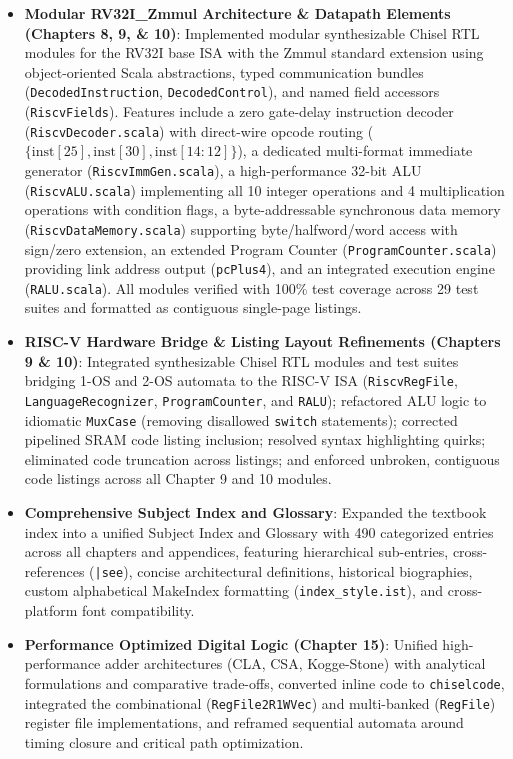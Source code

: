 \begin{itemize}
    \item \textbf{Modular RV32I\_Zmmul Architecture \& Datapath Elements (Chapters 8, 9, \& 10)}: Implemented modular synthesizable Chisel RTL modules for the RV32I base ISA with the Zmmul standard extension using object-oriented Scala abstractions, typed communication bundles (\texttt{DecodedInstruction}, \texttt{DecodedControl}), and named field accessors (\texttt{RiscvFields}). Features include a zero gate-delay instruction decoder (\texttt{RiscvDecoder.scala}) with direct-wire opcode routing ($\{\text{inst}[25], \text{inst}[30], \text{inst}[14:12]\}$), a dedicated multi-format immediate generator (\texttt{RiscvImmGen.scala}), a high-performance 32-bit ALU (\texttt{RiscvALU.scala}) implementing all 10 integer operations and 4 multiplication operations with condition flags, a byte-addressable synchronous data memory (\texttt{RiscvDataMemory.scala}) supporting byte/halfword/word access with sign/zero extension, an extended Program Counter (\texttt{ProgramCounter.scala}) providing link address output (\texttt{pcPlus4}), and an integrated execution engine (\texttt{RALU.scala}). All modules verified with 100\% test coverage across 29 test suites and formatted as contiguous single-page listings.
    \item \textbf{RISC-V Hardware Bridge \& Listing Layout Refinements (Chapters 9 \& 10)}: Integrated synthesizable Chisel RTL modules and test suites bridging 1-OS and 2-OS automata to the RISC-V ISA (\texttt{RiscvRegFile}, \texttt{LanguageRecognizer}, \texttt{ProgramCounter}, and \texttt{RALU}); refactored ALU logic to idiomatic \texttt{MuxCase} (removing disallowed \texttt{switch} statements); corrected pipelined SRAM code listing inclusion; resolved syntax highlighting quirks; eliminated code truncation across listings; and enforced unbroken, contiguous code listings across all Chapter 9 and 10 modules.
    \item \textbf{Comprehensive Subject Index and Glossary}: Expanded the textbook index into a unified Subject Index and Glossary with 490 categorized entries across all chapters and appendices, featuring hierarchical sub-entries, cross-references (\texttt{|see}), concise architectural definitions, historical biographies, custom alphabetical MakeIndex formatting (\texttt{index\_style.ist}), and cross-platform font compatibility.
    \item \textbf{Performance Optimized Digital Logic (Chapter 15)}: Unified high-performance adder architectures (CLA, CSA, Kogge-Stone) with analytical formulations and comparative trade-offs, converted inline code to \texttt{chiselcode}, integrated the combinational (\texttt{RegFile2R1WVec}) and multi-banked (\texttt{RegFile}) register file implementations, and reframed sequential automata around timing closure and critical path optimization.

\end{itemize}

